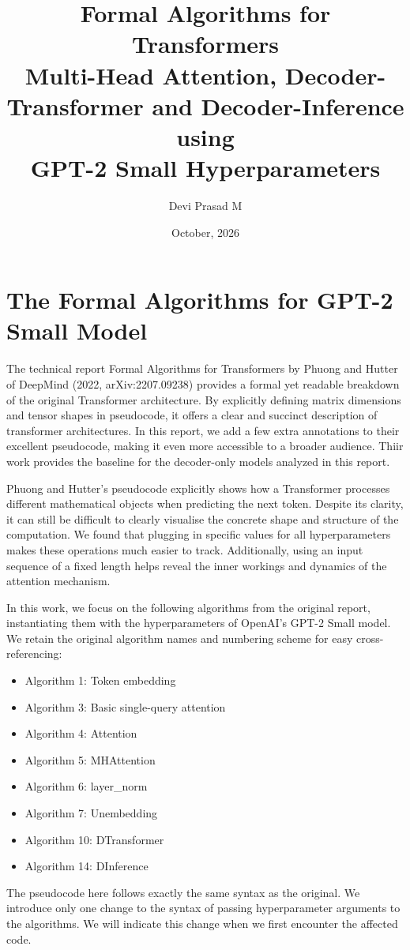 \documentclass[12pt]{article}
\title{Formal Algorithms for Transformers\\[4pt]
    {\large{Multi-Head Attention, Decoder-Transformer and Decoder-Inference\\using\vspace*{-7pt}\\GPT-2 Small Hyperparameters}}
     \\{\small\Draft{Draft 4}}}
\author{Devi Prasad M}
\date{October, 2026}
\begin{document}
\maketitle

\section{The Formal Algorithms for GPT-2 Small Model}
The technical report Formal Algorithms for Transformers
by Phuong and Hutter of DeepMind (2022, arXiv:2207.09238)
provides a formal yet readable breakdown of the original
Transformer architecture. By explicitly defining matrix
dimensions and tensor shapes in pseudocode, it offers a
clear and succinct description of transformer architectures.
In this report, we add a few extra annotations to their
excellent pseudocode, making it even more accessible to a
broader audience. Thiir work provides the baseline for
the decoder-only models analyzed in this report.

Phuong and Hutter's pseudocode explicitly shows how a
Transformer processes different mathematical objects when
predicting the next token. Despite its clarity, it can
still be difficult to clearly visualise the concrete
shape and structure of the computation. We found that
plugging in specific values for all hyperparameters
makes these operations much easier to track.
Additionally, using an input sequence of a fixed
length helps reveal the inner workings and dynamics
of the attention mechanism.


In this work, we focus on the following algorithms
from the original report, instantiating them with
the hyperparameters of OpenAI's GPT-2 Small model.
We retain the original algorithm names and numbering
scheme for easy cross-referencing:
\begin{itemize}
    \item Algorithm 1: Token embedding
    \item Algorithm 3: Basic single-query attention
    \item Algorithm 4: Attention
    \item Algorithm 5: MHAttention
    \item Algorithm 6: layer\_norm
    \item Algorithm 7: Unembedding
    \item Algorithm 10: DTransformer
    \item Algorithm 14: DInference
\end{itemize}

The pseudocode here follows exactly the same syntax as
the original. We introduce only one change to the syntax
of passing hyperparameter arguments to the algorithms.
We will indicate this change when we first encounter
the affected code.
\end{document}
